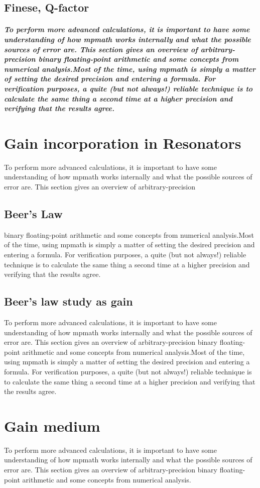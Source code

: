 \subsection{Finese, Q-factor}
\subparagraph{\normalfont \large To perform more advanced calculations, it is important to have some understanding of how mpmath works internally and what the possible sources of error are. This section gives an overview of arbitrary-precision binary floating-point arithmetic and some concepts from numerical analysis.Most of the time, using mpmath is simply a matter of setting the desired precision and entering a formula. For verification purposes, a quite (but not always!) reliable technique is to calculate the same thing a second time at a higher precision and verifying that the results agree.}
\section{Gain incorporation in Resonators}
To perform more advanced calculations, it is important to have some understanding of how mpmath works internally and what the possible sources of error are. This section gives an overview of arbitrary-precision
\subsection{Beer's Law}
 binary floating-point arithmetic and some concepts from numerical analysis.Most of the time, using mpmath is simply a matter of setting the desired precision and entering a formula. For verification purposes, a quite (but not always!) reliable technique is to calculate the same thing a second time at a higher precision and verifying that the results agree.
\subsection{Beer's law study as gain}
To perform more advanced calculations, it is important to have some understanding of how mpmath works internally and what the possible sources of error are. This section gives an overview of arbitrary-precision binary floating-point arithmetic and some concepts from numerical analysis.Most of the time, using mpmath is simply a matter of setting the desired precision and entering a formula. For verification purposes, a quite (but not always!) reliable technique is to calculate the same thing a second time at a higher precision and verifying that the results agree.
\section{Gain medium}
To perform more advanced calculations, it is important to have some understanding of how mpmath works internally and what the possible sources of error are. This section gives an overview of arbitrary-precision binary floating-point arithmetic and some concepts from numerical analysis.